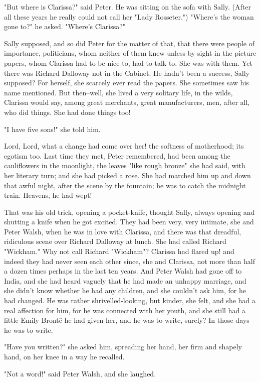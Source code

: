 \documentclass[lang=cn,10pt]{elegantbook}
\begin{document}
"But where is Clarissa?" said Peter.  He was sitting on the sofa
with Sally.  (After all these years he really could not call her
"Lady Rosseter.")  "Where's the woman gone to?" he asked.  "Where's
Clarissa?"

Sally supposed, and so did Peter for the matter of that, that there
were people of importance, politicians, whom neither of them knew
unless by sight in the picture papers, whom Clarissa had to be nice
to, had to talk to.  She was with them.  Yet there was Richard
Dalloway not in the Cabinet.  He hadn't been a success, Sally
supposed?  For herself, she scarcely ever read the papers.  She
sometimes saw his name mentioned.  But then--well, she lived a very
solitary life, in the wilds, Clarissa would say, among great
merchants, great manufacturers, men, after all, who did things.
She had done things too!

"I have five sons!" she told him.

Lord, Lord, what a change had come over her! the softness of
motherhood; its egotism too.  Last time they met, Peter remembered,
had been among the cauliflowers in the moonlight, the leaves "like
rough bronze" she had said, with her literary turn; and she had
picked a rose.  She had marched him up and down that awful night,
after the scene by the fountain; he was to catch the midnight
train.  Heavens, he had wept!

That was his old trick, opening a pocket-knife, thought Sally,
always opening and shutting a knife when he got excited.  They had
been very, very intimate, she and Peter Walsh, when he was in love
with Clarissa, and there was that dreadful, ridiculous scene over
Richard Dalloway at lunch.  She had called Richard "Wickham."  Why
not call Richard "Wickham"?  Clarissa had flared up! and indeed
they had never seen each other since, she and Clarissa, not more
than half a dozen times perhaps in the last ten years.  And Peter
Walsh had gone off to India, and she had heard vaguely that he had
made an unhappy marriage, and she didn't know whether he had any
children, and she couldn't ask him, for he had changed.  He was
rather shrivelled-looking, but kinder, she felt, and she had a real
affection for him, for he was connected with her youth, and she
still had a little Emily Brontë he had given her, and he was to
write, surely?  In those days he was to write.

"Have you written?" she asked him, spreading her hand, her firm and
shapely hand, on her knee in a way he recalled.

"Not a word!" said Peter Walsh, and she laughed.
\end{document}
